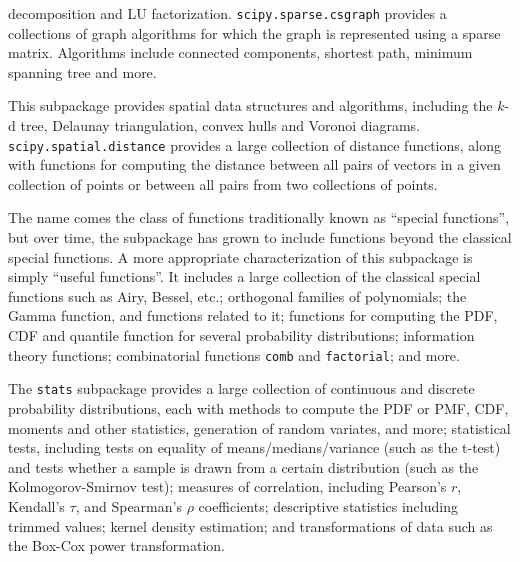 \begin{description}[leftmargin=!, labelwidth=\widthof{\bfseries \texttt{interpolate}}]
		decomposition and LU factorization.
    \texttt{scipy.sparse.csgraph} provides a collections of graph algorithms
    for which the graph is represented using a sparse matrix.  Algorithms
    include connected components, shortest path, minimum spanning tree
    and more.
\item[\texttt{spatial}]
    This subpackage provides spatial data structures and algorithms,
    including the $k$-d tree, Delaunay triangulation, convex hulls and Voronoi
    diagrams. \texttt{scipy.spatial.distance} provides
    a large collection of distance functions, along with functions for
    computing the distance between all pairs of vectors in a given collection
    of points or between all pairs from two collections of points.
\item[\texttt{special}]
    The name comes the class of functions traditionally known as ``special
    functions'', but over time, the subpackage has grown to include functions
    beyond the classical special functions.  A more appropriate characterization
    of this subpackage is simply ``useful functions''.
    It includes a large collection of the classical special functions
    such as Airy, Bessel, etc.; orthogonal families of polynomials;
    the Gamma function, and functions related to it;
    functions for computing the PDF, CDF and quantile function for several
    probability distributions;
    information theory functions;
    combinatorial functions \texttt{comb} and \texttt{factorial};
    and more.
\item[\texttt{stats}]
    The \texttt{stats} subpackage provides a large collection of continuous
    and discrete probability distributions, each with methods to compute
    the PDF or PMF, CDF, moments and other statistics, generation of random
    variates, and more;
    statistical tests, including tests on equality of means/medians/variance
    (such as the t-test) and tests whether a sample is drawn from a
    certain distribution (such as the Kolmogorov-Smirnov test);
    measures of correlation, including Pearson's $r$, Kendall's $\tau$, and
    Spearman's $\rho$ coefficients;
    descriptive statistics including trimmed values;
    kernel density estimation;
    and transformations of data such as the Box-Cox power transformation.
\end{description}
